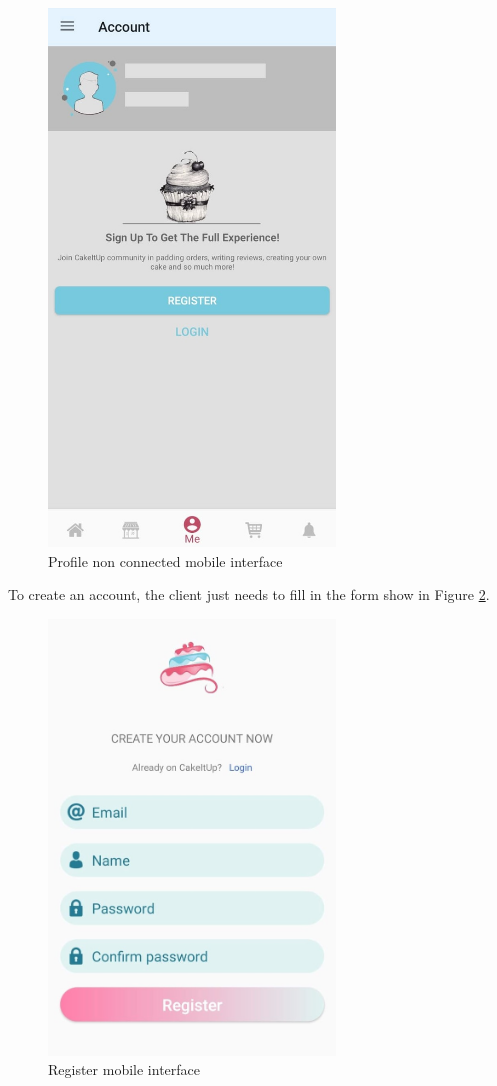 \documentclass[12pt,a4paper]{report}
\begin{document}
\begin{figure}[H]
	\vspace*{1in}
	\centering
	\includegraphics[width=3in,keepaspectratio]{accountnotconnectedlogin.jpg}
	\caption{Profile non connected mobile interface}
	\label{accountnonconnect-mobile-interface}
\end{figure} 
\clearpage
To create an account, the client just needs to fill in the form show in Figure \ref{register-mobile-interface}.
\begin{figure}[H]
		\vspace*{1in}
	\centering
	\includegraphics[width=3in,keepaspectratio]{registermobile.jpg}
	\caption{Register mobile interface}
	\label{register-mobile-interface}
\end{figure} 
\end{document}
